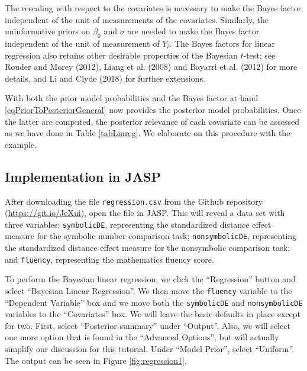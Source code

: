 \documentclass[english,,doc,floatsintext]{apa6}
\begin{document}
The rescaling with respect to the covariates is necessary to make the Bayes factor independent of the unit of measurements of the covariates. Similarly, the uninformative priors on \(\beta_{0}\) and \(\sigma\) are needed to make the Bayes factor independent of the unit of measurement of \(Y_{i}\). The Bayes factors for linear regression also retains other desirable properties of the Bayesian \(t\)-test; see Rouder and Morey (2012), Liang et al. (2008) and Bayarri et al. (2012) for more details, and Li and Clyde (2018) for further extensions.

With both the prior model probabilities and the Bayes factor at hand \eqref{eqPriorToPosteriorGeneral} now provides the posterior model probabilities. Once the latter are computed, the posterior relevance of each covariate can be assessed as we have done in Table \ref{tabLinreg}. We elaborate on this procedure with the example.

\hypertarget{implementation-in-jasp-1}{%
\subsection{Implementation in JASP}\label{implementation-in-jasp-1}}

After downloading the file \texttt{regression.csv} from the Github repository (\url{https://git.io/JeXui}), open the file in JASP. This will reveal a data set with three variables: \texttt{symbolicDE}, representing the standardized distance effect measure for the symbolic number comparison task; \texttt{nonsymbolicDE}, representing the standardized distance effect measure for the nonsymbolic comparison task; and \texttt{fluency}, representing the mathematics fluency score.

To perform the Bayesian linear regression, we click the \enquote{Regression} button and select \enquote{Bayesian Linear Regression}. We then move the \texttt{fluency} variable to the \enquote{Dependent Variable} box and we move both the \texttt{symbolicDE} and \texttt{nonsymbolicDE} variables to the \enquote{Covariates} box. We will leave the basic defaults in place except for two. First, select \enquote{Posterior summary} under \enquote{Output}. Also, we will select one more option that is found in the \enquote{Advanced Options}, but will actually simplify our discussion for this tutorial. Under \enquote{Model Prior}, select \enquote{Uniform}. The output can be seen in Figure \ref{fig:regression1}.
\end{document}

